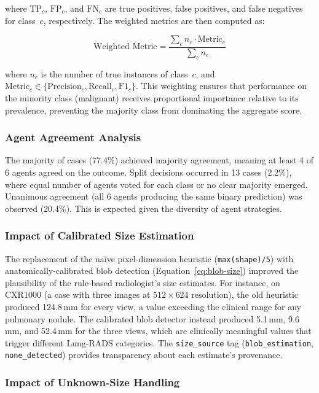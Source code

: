 \documentclass[12pt]{article}
\begin{document}
where $\text{TP}_c$, $\text{FP}_c$, and $\text{FN}_c$ are true positives, false positives, and false negatives for class~$c$, respectively. The weighted metrics are then computed as:

\begin{equation}
\text{Weighted Metric} = \frac{\sum_{c} n_c \cdot \text{Metric}_c}{\sum_{c} n_c}
\end{equation}

where $n_c$ is the number of true instances of class~$c$, and $\text{Metric}_c \in \{\text{Precision}_c, \text{Recall}_c, \text{F1}_c\}$. This weighting ensures that performance on the minority class (malignant) receives proportional importance relative to its prevalence, preventing the majority class from dominating the aggregate score.

\subsubsection{Agent Agreement Analysis}

The majority of cases (77.4\%) achieved majority agreement, meaning at least 4 of 6 agents agreed on the outcome. Split decisions occurred in 13 cases (2.2\%), where equal number of agents voted for each class or no clear majority emerged. Unanimous agreement (all 6 agents producing the same binary prediction) was observed (20.4\%). This is expected given the diversity of agent strategies.

\subsubsection{Impact of Calibrated Size Estimation}

The replacement of the na\"ive pixel-dimension heuristic (\texttt{max(shape)/5}) with anatomically-calibrated blob detection (Equation~\ref{eq:blob-size}) improved the plausibility of the rule-based radiologist's size estimates. For instance, on CXR1000 (a case with three images at $512\times624$ resolution), the old heuristic produced 124.8\,mm for every view, a value exceeding the clinical range for any pulmonary nodule. The calibrated blob detector instead produced 5.1\,mm, 9.6\,mm, and 52.4\,mm for the three views, which are clinically meaningful values that trigger different Lung-RADS categories. The \texttt{size\_source} tag (\texttt{blob\_estimation}, \texttt{none\_detected}) provides transparency about each estimate's provenance.

\subsubsection{Impact of Unknown-Size Handling}
\end{document}
